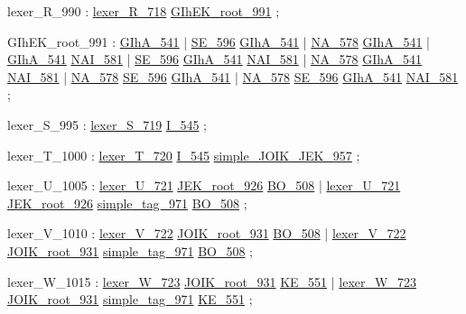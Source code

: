 \label{html:y990}
lexer_R_990             :  \hyperref[html:y718]{lexer_R_718}  \hyperref[html:y991]{GIhEK_root_991}
                        ;

\label{html:y991}
GIhEK_root_991          :  \hyperref[html:y541]{GIhA_541}
                        |  \hyperref[html:y596]{SE_596}  \hyperref[html:y541]{GIhA_541}
                        |  \hyperref[html:y578]{NA_578}  \hyperref[html:y541]{GIhA_541}
                        |  \hyperref[html:y541]{GIhA_541}  \hyperref[html:y581]{NAI_581}
                        |  \hyperref[html:y596]{SE_596}  \hyperref[html:y541]{GIhA_541}  \hyperref[html:y581]{NAI_581}
                        |  \hyperref[html:y578]{NA_578}  \hyperref[html:y541]{GIhA_541}  \hyperref[html:y581]{NAI_581}
                        |  \hyperref[html:y578]{NA_578}  \hyperref[html:y596]{SE_596}  \hyperref[html:y541]{GIhA_541}
                        |  \hyperref[html:y578]{NA_578}  \hyperref[html:y596]{SE_596}  \hyperref[html:y541]{GIhA_541}  \hyperref[html:y581]{NAI_581}
                        ;

\label{html:y995}
lexer_S_995             :  \hyperref[html:y719]{lexer_S_719}  \hyperref[html:y545]{I_545}
                        ;

\label{html:y1000}
lexer_T_1000            :  \hyperref[html:y720]{lexer_T_720}  \hyperref[html:y545]{I_545}  \hyperref[html:y957]{simple_JOIK_JEK_957}
                        ;

\label{html:y1005}
lexer_U_1005            :  \hyperref[html:y721]{lexer_U_721}  \hyperref[html:y926]{JEK_root_926}  \hyperref[html:y508]{BO_508}
                        |  \hyperref[html:y721]{lexer_U_721}  \hyperref[html:y926]{JEK_root_926}  \hyperref[html:y971]{simple_tag_971}  \hyperref[html:y508]{BO_508}
                        ;

\label{html:y1010}
lexer_V_1010            :  \hyperref[html:y722]{lexer_V_722}  \hyperref[html:y931]{JOIK_root_931}  \hyperref[html:y508]{BO_508}
                        |  \hyperref[html:y722]{lexer_V_722}  \hyperref[html:y931]{JOIK_root_931}  \hyperref[html:y971]{simple_tag_971}  \hyperref[html:y508]{BO_508}
                        ;

\label{html:y1015}
lexer_W_1015            :  \hyperref[html:y723]{lexer_W_723}  \hyperref[html:y931]{JOIK_root_931}  \hyperref[html:y551]{KE_551}
                        |  \hyperref[html:y723]{lexer_W_723}  \hyperref[html:y931]{JOIK_root_931}  \hyperref[html:y971]{simple_tag_971}  \hyperref[html:y551]{KE_551}
                        ;


